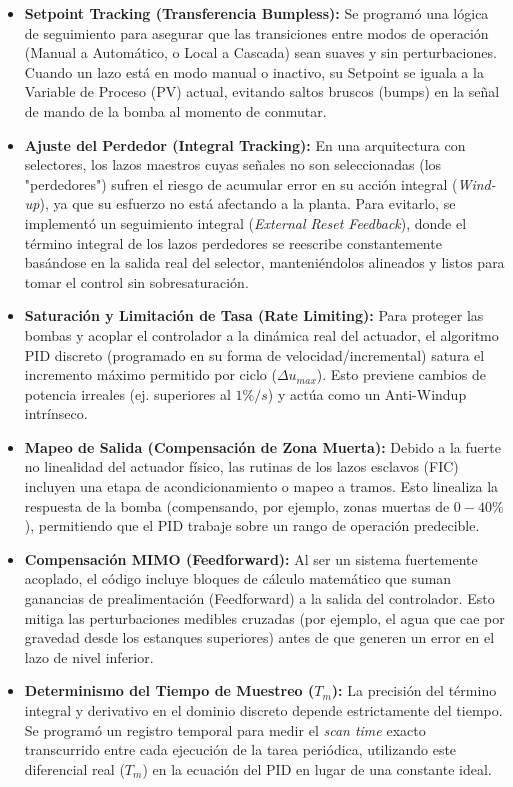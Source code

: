 \begin{itemize}
    \item \textbf{Setpoint Tracking (Transferencia Bumpless):} Se programó una lógica de seguimiento para asegurar que las transiciones entre modos de operación (Manual a Automático, o Local a Cascada) sean suaves y sin perturbaciones. Cuando un lazo está en modo manual o inactivo, su Setpoint se iguala a la Variable de Proceso (PV) actual, evitando saltos bruscos (bumps) en la señal de mando de la bomba al momento de conmutar.
    
    \item \textbf{Ajuste del Perdedor (Integral Tracking):} En una arquitectura con selectores, los lazos maestros cuyas señales no son seleccionadas (los "perdedores") sufren el riesgo de acumular error en su acción integral (\textit{Wind-up}), ya que su esfuerzo no está afectando a la planta. Para evitarlo, se implementó un seguimiento integral (\textit{External Reset Feedback}), donde el término integral de los lazos perdedores se reescribe constantemente basándose en la salida real del selector, manteniéndolos alineados y listos para tomar el control sin sobresaturación.
    
    \item \textbf{Saturación y Limitación de Tasa (Rate Limiting):} Para proteger las bombas y acoplar el controlador a la dinámica real del actuador, el algoritmo PID discreto (programado en su forma de velocidad/incremental) satura el incremento máximo permitido por ciclo ($\Delta u_{max}$). Esto previene cambios de potencia irreales (ej. superiores al $1\%/s$) y actúa como un Anti-Windup intrínseco.
    
    \item \textbf{Mapeo de Salida (Compensación de Zona Muerta):} Debido a la fuerte no linealidad del actuador físico, las rutinas de los lazos esclavos (FIC) incluyen una etapa de acondicionamiento o mapeo a tramos. Esto linealiza la respuesta de la bomba (compensando, por ejemplo, zonas muertas de $0-40\%$), permitiendo que el PID trabaje sobre un rango de operación predecible.
    
    \item \textbf{Compensación MIMO (Feedforward):} Al ser un sistema fuertemente acoplado, el código incluye bloques de cálculo matemático que suman ganancias de prealimentación (Feedforward) a la salida del controlador. Esto mitiga las perturbaciones medibles cruzadas (por ejemplo, el agua que cae por gravedad desde los estanques superiores) antes de que generen un error en el lazo de nivel inferior.
    
    \item \textbf{Determinismo del Tiempo de Muestreo ($T_m$):} La precisión del término integral y derivativo en el dominio discreto depende estrictamente del tiempo. Se programó un registro temporal para medir el \textit{scan time} exacto transcurrido entre cada ejecución de la tarea periódica, utilizando este diferencial real ($T_m$) en la ecuación del PID en lugar de una constante ideal.
\end{itemize}
